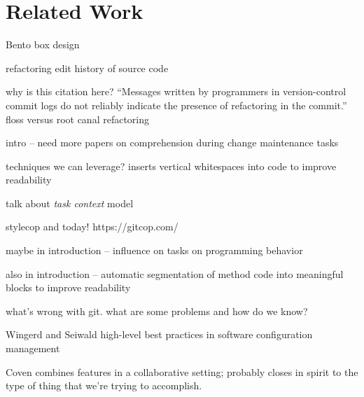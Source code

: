 \documentclass[conference]{IEEEtran}
\begin{document}








\section{Related Work}

Bento box design~\cite{DeLine2010a}

refactoring edit history of source code~\cite{Hayashi2012}

why is this citation here? ``Messages written by programmers in version-control commit logs do not reliably indicate the presence of refactoring in the commit.''
floss versus root canal refactoring~\cite{Murphy-Hill2012c}

intro -- need more papers on comprehension during change maintenance tasks

techniques we can leverage?
inserts vertical whitespaces into code to improve readability~\cite{Wang2011}


talk about \emph{task context} model

stylecop
and today! https://gitcop.com/


maybe in introduction -- influence on tasks on programming behavior~\cite{Ying2011a}

also in introduction -- automatic segmentation of method code into
meaningful blocks to improve readability 

what's wrong with git. what are some problems and how do we know?~\cite{PerezDeRosso2013}

Wingerd and Seiwald
high-level best practices in software configuration management~\cite{Wingerd1998}

Coven combines features in a collaborative setting; probably closes in spirit to the type of thing that we're trying to accomplish.~\cite{Chu-Carroll2000}
\end{document}
